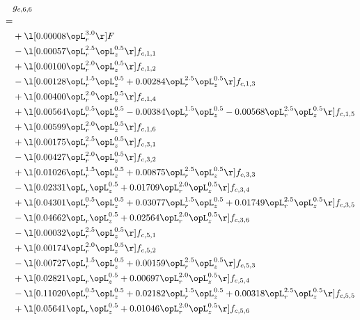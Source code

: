 \begin{alignat}{2} 
\label{eq:g_66_0} 
& g_{c,6,6} \nonumber \\ 
 = \\ 
& + \l[  0.00008 \opL_r^{3.0}  \r] F \nonumber \\ 
& - \l[  0.00057 \opL_r^{2.5} \opL_z^{0.5}  \r] f_{c,1,1} \nonumber \\ 
& + \l[  0.00100 \opL_r^{2.0} \opL_z^{0.5}  \r] f_{c,1,2} \nonumber \\ 
& - \l[  0.00128 \opL_r^{1.5} \opL_z^{0.5} +  0.00284 \opL_r^{2.5} \opL_z^{0.5}  \r] f_{c,1,3} \nonumber \\ 
& + \l[  0.00400 \opL_r^{2.0} \opL_z^{0.5}  \r] f_{c,1,4} \nonumber \\ 
& + \l[  0.00564 \opL_r^{0.5} \opL_z^{0.5}   -0.00384 \opL_r^{1.5} \opL_z^{0.5}   -0.00568 \opL_r^{2.5} \opL_z^{0.5}  \r] f_{c,1,5} \nonumber \\ 
& + \l[  0.00599 \opL_r^{2.0} \opL_z^{0.5}  \r] f_{c,1,6} \nonumber \\ 
& + \l[  0.00175 \opL_r^{2.5} \opL_z^{0.5}  \r] f_{c,3,1} \nonumber \\ 
& - \l[  0.00427 \opL_r^{2.0} \opL_z^{0.5}  \r] f_{c,3,2} \nonumber \\ 
& + \l[  0.01026 \opL_r^{1.5} \opL_z^{0.5} +  0.00875 \opL_r^{2.5} \opL_z^{0.5}  \r] f_{c,3,3} \nonumber \\ 
& - \l[  0.02331 \opL_r \opL_z^{0.5} +  0.01709 \opL_r^{2.0} \opL_z^{0.5}  \r] f_{c,3,4} \nonumber \\ 
& + \l[  0.04301 \opL_r^{0.5} \opL_z^{0.5} +  0.03077 \opL_r^{1.5} \opL_z^{0.5} +  0.01749 \opL_r^{2.5} \opL_z^{0.5}  \r] f_{c,3,5} \nonumber \\ 
& - \l[  0.04662 \opL_r \opL_z^{0.5} +  0.02564 \opL_r^{2.0} \opL_z^{0.5}  \r] f_{c,3,6} \nonumber \\ 
& - \l[  0.00032 \opL_r^{2.5} \opL_z^{0.5}  \r] f_{c,5,1} \nonumber \\ 
& + \l[  0.00174 \opL_r^{2.0} \opL_z^{0.5}  \r] f_{c,5,2} \nonumber \\ 
& - \l[  0.00727 \opL_r^{1.5} \opL_z^{0.5} +  0.00159 \opL_r^{2.5} \opL_z^{0.5}  \r] f_{c,5,3} \nonumber \\ 
& + \l[  0.02821 \opL_r \opL_z^{0.5} +  0.00697 \opL_r^{2.0} \opL_z^{0.5}  \r] f_{c,5,4} \nonumber \\ 
& - \l[  0.11020 \opL_r^{0.5} \opL_z^{0.5} +  0.02182 \opL_r^{1.5} \opL_z^{0.5} +  0.00318 \opL_r^{2.5} \opL_z^{0.5}  \r] f_{c,5,5} \nonumber \\ 
& + \l[  0.05641 \opL_r \opL_z^{0.5} +  0.01046 \opL_r^{2.0} \opL_z^{0.5}  \r] f_{c,5,6} \nonumber \\ 
\end{alignat} 


